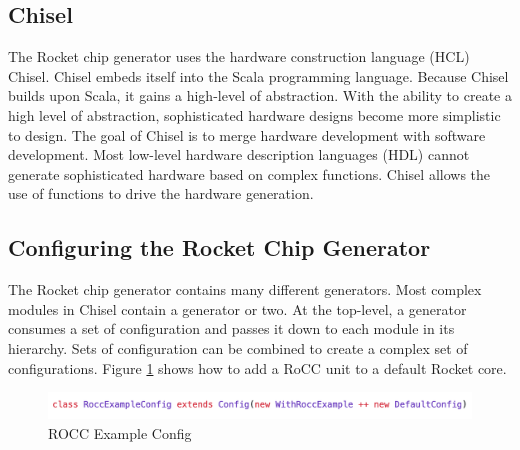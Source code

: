 \documentclass[../main.tex]{subfiles}
\begin{document}
\subsection{Chisel}
The Rocket chip generator uses the hardware construction language (HCL) Chisel\cite{chisel:book}. Chisel embeds itself into the Scala programming language. Because Chisel builds upon Scala, it gains a high-level of abstraction. With the ability to create a high level of abstraction, sophisticated hardware designs become more simplistic to design. The goal of Chisel is to merge hardware development with software development\cite{chisel:book}. Most low-level hardware description languages (HDL) cannot generate sophisticated hardware based on complex functions. Chisel allows the use of functions to drive the hardware generation\cite{chisel:book}.


\subsection{Configuring the Rocket Chip Generator}
The Rocket chip generator contains many different generators. Most complex modules in Chisel contain a generator or two. At the top-level, a generator consumes a set of configuration and passes it down to each module in its hierarchy. Sets of configuration can be combined to create a complex set of configurations. Figure \ref{fig:configsnipit} shows how to add a RoCC unit to a default Rocket core. 

\begin{figure}
    \centering
    \includegraphics[scale=.4]{pngs/ConfigSnipit.png}
    \caption{ROCC Example Config}
    \label{fig:configsnipit}
\end{figure}
\end{document}
